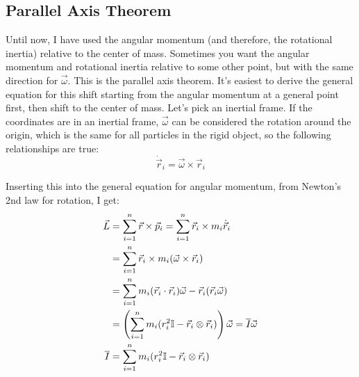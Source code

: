 \documentclass[10pt]{article}
\begin{document}
\subsection{Parallel Axis Theorem}

Until now, I have used the angular momentum (and therefore, the rotational 
inertia) relative to the center of mass. Sometimes you want the angular 
momentum and rotational inertia relative to some other point, but 
with the same direction for $\vec{\omega}$. This is the parallel 
axis theorem. It's easiest to derive the general equation for this shift
starting from the angular momentum at a general point first, then 
shift to the center of mass. Let's pick an inertial frame.
If the coordinates are in an inertial frame, $\vec{\omega}$ can 
be considered the rotation around the origin, which is the same for 
all particles in the rigid object, so the following relationships are 
true:
\begin{equation}
    \dot{\vec{r}}_i = \vec{\omega}\times\vec{r}_i
\end{equation}

Inserting this into the general equation for angular momentum, 
from Newton's 2nd law for rotation, I get:
\begin{align}
    \vec{L} &= \sum_{i=1}^n \vec{r}\times \vec{p}_i = 
        \sum_{i=1}^n \vec{r}_i\times m_i\dot{\vec{r}}_i \notag\\
    &= \sum_{i=1}^n \vec{r}_i\times m_i(\vec{\omega}\times\vec{r}_i) \notag\\
    &= \sum_{i=1}^n m_i (\vec{r}_i\cdot\vec{r}_i)\vec{\omega} - 
        \vec{r}_i(\vec{r}_i\vec{\omega}) \notag\\
    &= \left(\sum_{i=1}^n m_i (r^2_i\mathbb{I} - 
        \vec{r}_i\otimes\vec{r}_i)\right)\vec{\omega} 
    = \overline{I}\vec{\omega} \notag\\
    \overline{I} &= \sum_{i=1}^n m_i (r^2_i\mathbb{I} - 
        \vec{r}_i\otimes\vec{r}_i)
\end{align}
\end{document}

